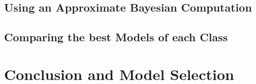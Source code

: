 \documentclass[
]{article}
\begin{document}
\hypertarget{using-an-approximate-bayesian-computation}{%
\subsection{Using an Approximate Bayesian
Computation}\label{using-an-approximate-bayesian-computation}}

\hypertarget{comparing-the-best-models-of-each-class}{%
\subsection{Comparing the best Models of each
Class}\label{comparing-the-best-models-of-each-class}}

\hypertarget{conclusion-and-model-selection}{%
\section{Conclusion and Model
Selection}\label{conclusion-and-model-selection}}
\end{document}

